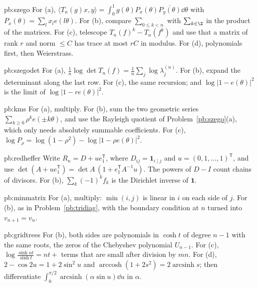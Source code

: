 \begin{hint}{pb:szego}
For (a), $\langle T_n(g)x,y\rangle=\int_0^1g(\theta)P_x(\theta)\overline{P_y(\theta)}\dd\theta$ with $P_x(\theta)=\sum_lx_le(l\theta)$. For (b), compare $\sum_{0\le k<n}$ with $\sum_{k\in\Z}$ in the product
of the matrices. For (c), telescope $T_n(f)^k-T_n(f^k)$ and use that a matrix of rank $r$ and norm $\le C$ has trace at most $rC$ in modulus. For (d), polynomials first, then Weierstrass.
\end{hint}

\begin{hint}{pb:szegodet}
For (a), $\frac1n\log\det T_n(f)=\frac1n\sum_j\log\lambda_j^{(n)}$. For (b), expand the determinant along the last row. For (c), the same recursion; and $\log|1-e(\theta)|^2$ is the limit of
$\log|1-re(\theta)|^2$.
\end{hint}

\begin{hint}{pb:kms}
For (a), multiply. For (b), sum the two geometric series $\sum_{k\ge0}\rho^ke(\pm k\theta)$, and use the Rayleigh quotient of Problem~\ref{pb:szego}(a), which only needs absolutely summable
coefficients. For (c), $\log P_\rho=\log(1-\rho^2)-\log|1-\rho e(\theta)|^2$.
\end{hint}

\begin{hint}{pb:redheffer}
Write $R_n=D+ue_1^{\mathsf T}$, where $D_{ij}=\mathbf 1_{i\mid j}$ and $u=(0,1,\dots,1)^{\mathsf T}$, and use $\det(A+ue_1^{\mathsf T})=\det A\,(1+e_1^{\mathsf T}A^{-1}u)$. The powers of $D-I$ count chains of divisors.
For (b), $\sum_k(-1)^kf_k$ is the Dirichlet inverse of $\mathbf 1$.
\end{hint}

\begin{hint}{pb:minmatrix}
For (a), multiply: $\min(i,j)$ is linear in $i$ on each side of $j$. For (b), as in Problem~\ref{pb:tridiag}, with the boundary condition at $n$ turned into $v_{n+1}=v_n$.
\end{hint}

\begin{hint}{pb:gridtrees}
For (b), both sides are polynomials in $\cosh t$ of degree $n-1$ with the same roots, the zeros of the Chebyshev polynomial $U_{n-1}$. For (c), $\log\frac{\sinh nt}{\sinh t}=nt+$ terms that
are small after division by $mn$. For (d), $2-\cos2u=1+2\sin^2u$ and $\operatorname{arccosh}(1+2s^2)=2\operatorname{arcsinh}s$; then differentiate $\int_0^{\pi/2}\operatorname{arcsinh}(\alpha\sin u)\dd u$ in $\alpha$.
\end{hint}

